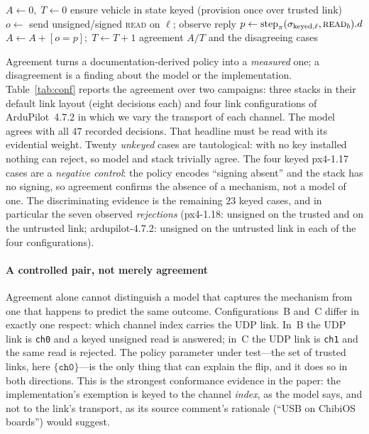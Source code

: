 \documentclass[conference]{IEEEtran}
\newcommand{\code}[1]{\texttt{#1}}
\begin{document}
\begin{algorithm}[t]
\caption{Conformance of policy $\pi$ to a live stack}
\label{alg:conf}
\small
\begin{algorithmic}[1]
\State $A\gets 0,\;T\gets 0$
  \State ensure vehicle in state keyed (provision once over trusted link)
  \State $o\gets$ send unsigned/signed \textsc{read} on $\ell$; observe reply
  \State $p\gets \mathrm{step}_\pi(\sigma_{\text{keyed},\ell},\textsc{read}_b).d$
  \State $A\gets A+[o{=}p];\;T\gets T+1$
\EndFor
\State \Return agreement $A/T$ and the disagreeing cases
\endgraf
\end{algorithmic}
\end{algorithm}

Agreement turns a documentation-derived policy into a \emph{measured} one; a
disagreement is a finding about the model or the implementation.
Table~\ref{tab:conf} reports the agreement over two campaigns: three stacks in
their default link layout (eight decisions each) and four link configurations of
ArduPilot~4.7.2 in which we vary the transport of each channel. The model agrees
with all $47$ recorded decisions. That headline must be read with its evidential
weight. Twenty \emph{unkeyed} cases are tautological: with no key installed
nothing can reject, so model and stack trivially agree. The four keyed
\textsf{px4-1.17} cases are a \emph{negative control}: the policy encodes
``signing absent'' and the stack has no signing, so agreement confirms the
absence of a mechanism, not a model of one. The discriminating evidence is the
remaining $23$ keyed cases, and in particular the seven observed
\emph{rejections} (\textsf{px4-1.18}: unsigned on the trusted and on the
untrusted link; \textsf{ardupilot-4.7.2}: unsigned on the untrusted link in each
of the four configurations).

\paragraph*{A controlled pair, not merely agreement} Agreement alone cannot
distinguish a model that captures the mechanism from one that happens to predict
the same outcome. Configurations~B and~C differ in exactly one respect: which
channel index carries the UDP link. In~B the UDP link is \code{ch0} and a keyed
unsigned read is answered; in~C the UDP link is \code{ch1} and the same read is
rejected. The policy parameter under test---the set of trusted links, here
$\{\code{ch0}\}$---is the only thing that can explain the flip, and it does so in
both directions. This is the strongest conformance evidence in the paper: the
implementation's exemption is keyed to the channel \emph{index}, as the model
says, and not to the link's transport, as its source comment's rationale
(``USB on ChibiOS boards'') would suggest.
\end{document}
